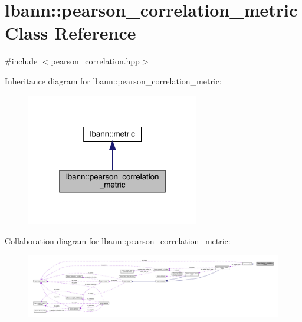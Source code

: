 \hypertarget{classlbann_1_1pearson__correlation__metric}{}\section{lbann\+:\+:pearson\+\_\+correlation\+\_\+metric Class Reference}
\label{classlbann_1_1pearson__correlation__metric}


{\ttfamily \#include $<$pearson\+\_\+correlation.\+hpp$>$}



Inheritance diagram for lbann\+:\+:pearson\+\_\+correlation\+\_\+metric\+:\nopagebreak
\begin{figure}[H]
\begin{center}
\leavevmode
\includegraphics[width=214pt]{classlbann_1_1pearson__correlation__metric__inherit__graph}
\end{center}
\end{figure}


Collaboration diagram for lbann\+:\+:pearson\+\_\+correlation\+\_\+metric\+:\nopagebreak
\begin{figure}[H]
\begin{center}
\leavevmode
\includegraphics[width=350pt]{classlbann_1_1pearson__correlation__metric__coll__graph}
\end{center}
\end{figure}
